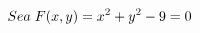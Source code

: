 \documentclass[preview]{standalone}
\begin{document}
\begin{align*}
Sea\hspace{.1cm} F(x,y) = x^2 + y^2 - 9 = 0
\end{align*}
\end{document}
